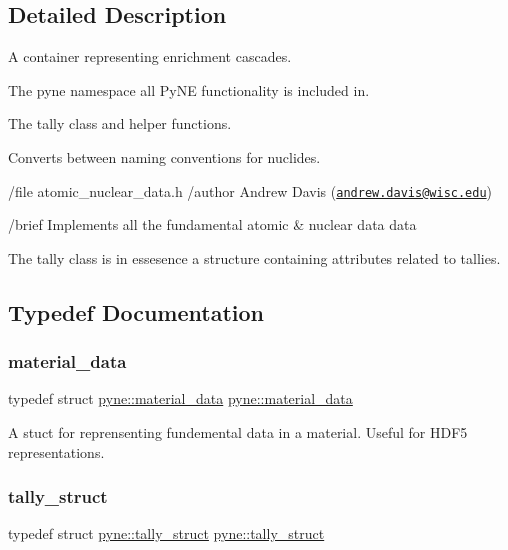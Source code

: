 \subsection{Detailed Description}
A container representing enrichment cascades. 

The \textquotesingle{}pyne\textquotesingle{} namespace all Py\+NE functionality is included in.

The tally class and helper functions.

Converts between naming conventions for nuclides.

/file atomic\+\_\+nuclear\+\_\+data.\+h /author Andrew Davis (\href{mailto:andrew.davis@wisc.edu}{\tt andrew.\+davis@wisc.\+edu})

/brief Implements all the fundamental atomic \& nuclear data data

The tally class is in essesence a structure containing attributes related to tallies. 

\subsection{Typedef Documentation}
\mbox{\label{namespacepyne_a30fee8818307aa6d8d45dc33ddee6008}} 
\subsubsection{\texorpdfstring{material\+\_\+data}{material\_data}}
{\footnotesize\ttfamily typedef struct \hyperlink{structpyne_1_1material__data}{pyne\+::material\+\_\+data}  \hyperlink{structpyne_1_1material__data}{pyne\+::material\+\_\+data}}

A stuct for reprensenting fundemental data in a material. Useful for H\+D\+F5 representations. \mbox{\label{namespacepyne_a50f65e8f1e109c362c1cd737d0627941}} 
\subsubsection{\texorpdfstring{tally\+\_\+struct}{tally\_struct}}
{\footnotesize\ttfamily typedef struct \hyperlink{structpyne_1_1tally__struct}{pyne\+::tally\+\_\+struct}  \hyperlink{structpyne_1_1tally__struct}{pyne\+::tally\+\_\+struct}}

